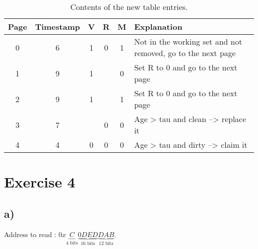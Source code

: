 \documentclass[a4paper,11pt]{report}
\begin{document}
\begin{table}[h]
\centering
\caption{Contents of the new table entries.}
\label{table:ex3-4}
\begin{tabular}{cccccl}
\hline
\multicolumn{1}{|c|}{\textbf{Page}} & \multicolumn{1}{c|}{\textbf{Timestamp}} & \multicolumn{1}{c|}{\textbf{V}} & \multicolumn{1}{c|}{\textbf{R}} & \multicolumn{1}{c|}{\textbf{M}} & \multicolumn{1}{l|}{\textbf{Explanation}}                                  \\ \hline
0                                   & 6                                       & 1                               & 0                               & 1                               & Not in the working set and not removed, go to the next page \\
1                                   & 9                                       & 1                               & \color{red}{0}                  & 0                               & Set R to $0$ and go to the next page                                       \\
2                                   & 9                                       & 1                               & \color{red}{0}                  & 1                               & Set R to $0$ and go to the next page                                       \\
  3                                   & 7                         & \color{red}{0}                               & 0                  & 0                               & Age > tau and clean --> replace it                                         \\
4                                   & 4                                       & 0                               & 0                               & 0                               & Age > tau and dirty --> claim it                                          
\end{tabular}
\end{table}

\section*{Exercise 4}


\subsection*{a)}

Address to read : $0x\underbrace{C}_{4 \text{ bits}}\underbrace{0DED}_{16 \text{ bits}}\underbrace{DAB}_{12 \text{ bits}}$.
\end{document}
